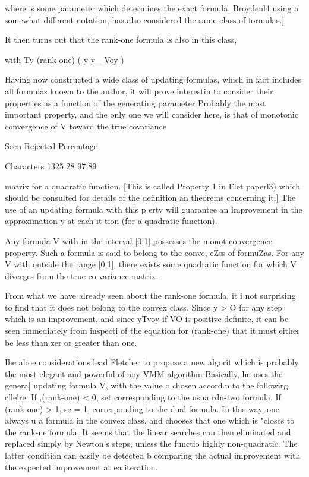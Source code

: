  
where  is some parameter which determines the exact formula.  Broydenl4
using a somewhat different notation, has also considered the same class
of formulas.]
 
     It then turns out that the rank-one formula is also in this class,
 
with
                                          Ty
                       (rank-one) 
                               ( y y_ Voy-)
 
 
 
     Having now constructed a wide class of updating formulas, which in
fact includes all formulas known to the author, it will prove interestin
to consider their properties as a function of the generating parameter
Probably the most important property, and the only one we will consider
here, is that of monotonic convergence of V toward the true covariance
 
                 Seen Rejected  Percentage
 
Characters       1325       28   97.89
 
matrix for a quadratic function.  [This is called Property 1 in Flet
paperl3) which should be consulted for details of the definition an
theorems concerning it.]  The use of an updating formula with this p
erty will guarantee an improvement in the approximation y at each it
tion (for a quadratic function).
 
     Any formula V with  in the interval [0,1] possesses the monot
convergence property.  Such a formula is said to belong to the conve,
cZss of formuZas. For any V with  outside the range [0,1], there
exists some quadratic function for which V diverges from the true co
variance matrix.
 
     From what we have already seen about the rank-one formula, it i
not surprising to find that it does not belong to the convex class.
Since  y > O for any step which is an improvement, and since yTvoy
if VO is positive-definite, it can be seen immediately from inspecti
of the equation for (rank-one) that it must either be less than zer
or greater than one.
 
     Ihe aboe considerations lead Fletcher to propose a new algorit
which is probably the most elegant and powerful of any VMM algorithm
Basically, he uses the genera] updating formula V, with the value o
chosen accord.n to the followirg clle!re:  If ,(rank-one) < 0, set
corresponding to the usua rdn-two formula.  If (rank-one) > 1, se
 = 1, corresponding to the dual formula.  In this way, one always u
a formula in the convex class, and chooses that one which is "closes
to the rank-ne formula.  It seems that the linear searches can then
eliminated and replaced simply by Newton's steps, unless the functio
highly non-quadratic.  The latter condition can easily be detected b
comparing the actual improvement with the expected improvement at ea
iteration.
 
